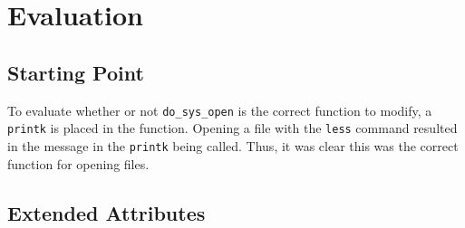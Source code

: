 \section{Evaluation}

\subsection*{Starting Point}

To evaluate whether or not \texttt{do\_sys\_open} is the correct function to modify, a \texttt{printk} is placed in the function. Opening a file with the \texttt{less} command resulted in the message in the \texttt{printk} being called. Thus, it was clear this was the correct function for opening files.

\subsection*{Extended Attributes}

